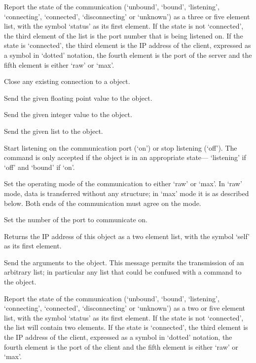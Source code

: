   \objListCmdBegin

  Report the state of the communication (`unbound', `bound', `listening', `connecting', `connected',
  `disconnecting' or `unknown') as a three or five element list, with the symbol `status' as its
  first element.
  If the state is not `connected', the third element of the list is the port number that is being
  listened on.
  If the state is `connected', the third element is the IP address of the client, expressed as a
  symbol in `dotted' notation, the fourth element is the port of the server and the fifth element is either
  `raw' or `max'.

  Close any existing connection to a  object.

  Send the given floating point value to the  object.

  Send the given integer value to the  object.

  Send the given list to the  object.

  Start listening on the communication port (`on') or stop listening (`off').
  The command is only accepted if the  object is in an appropriate state---
  `listening' if `off' and `bound' if `on'.

  Set the operating mode of the communication to either `raw' or `max'.
  In `raw' mode, data is transferred without any structure; in `max' mode it is as described below.
  Both ends of the communication must agree on the mode.

  Set the number of the port to communicate on.

  Returns the IP address of this object as a two element list, with the symbol `self' as its first
  element.
  
  Send the arguments to the  object.
  This message permits the transmission of an arbitrary list; in particular any list that could be
  confused with a command to the  object.

  Report the state of the communication (`unbound', `bound', `listening', `connecting', `connected',
  `disconnecting' or `unknown') as a two or five element list, with the symbol `status' as its
  first element.
  If the state is not `connected', the list will contain two elements.
  If the state is `connected', the third element is the IP address of the client, expressed as a
  symbol in `dotted' notation, the fourth element is the port of the client and the fifth element is either
  `raw' or `max'.

